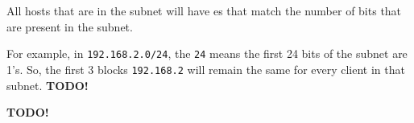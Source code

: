 \begin{definition}[Subnet]\label{def:Subnet}
  All hosts that are in the subnet will have es that match the number of bits that are present in the subnet.

  For example, in \texttt{192.168.2.0/24}, the \texttt{24} means the first 24 bits of the subnet are 1's.
  So, the first 3  blocks \texttt{192.168.2} will remain the same for every client in that subnet.
  \textbf{TODO!}
\end{definition}

\begin{definition}
  \textbf{TODO!}
\end{definition}

